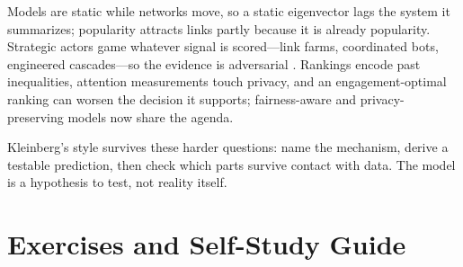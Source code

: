Models are static while networks move, so a static eigenvector lags the system it summarizes; popularity attracts links partly because it is already popularity. Strategic actors game whatever signal is scored---link farms, coordinated bots, engineered cascades---so the evidence is adversarial \cite{kleinberg-bursts}. Rankings encode past inequalities, attention measurements touch privacy, and an engagement-optimal ranking can worsen the decision it supports; fairness-aware and privacy-preserving models now share the agenda.

Kleinberg's style survives these harder questions: name the mechanism, derive a testable prediction, then check which parts survive contact with data. The model is a hypothesis to test, not reality itself.

\section{Exercises and Self-Study Guide}
